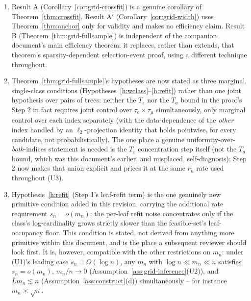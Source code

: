\documentclass[11pt]{article}
\theoremstyle{plain}
\theoremstyle{definition}
\theoremstyle{remark}
\begin{document}
\begin{enumerate}[label=(\alph*),leftmargin=*]
\item Result A (Corollary~\ref{cor:grid-crossfit}) is a genuine corollary
of Theorem~\ref{thm:crossfit}. Result A$'$ (Corollary~\ref{cor:grid-width})
uses Theorem~\ref{thm:anchor} only for validity and makes no efficiency
claim. Result B (Theorem~\ref{thm:grid-fullsample}) is independent of the
companion document's main efficiency theorem: it replaces, rather than
extends, that theorem's sparsity-dependent selection-event proof, using a
different technique throughout.

\item Theorem~\ref{thm:grid-fullsample}'s hypotheses are now stated as
three marginal, single-class conditions
(Hypotheses~\ref{h:wclass}--\ref{h:refit}) rather than one joint hypothesis
over pairs of trees: neither the $T_\varepsilon$ nor the $T_a$ bound in the
proof's Step 2 in fact requires joint control over $\tau_e\times\tau_\mu$
simultaneously, only marginal control over each index separately (with the
data-dependence of the \emph{other} index handled by an $\ell_2$-projection
identity that holds pointwise, for every candidate, not probabilistically).
The one place a genuine uniformity-over-\emph{both}-indices statement is
needed is the $T_\varepsilon$ concentration step itself (not the $T_a$
bound, which was this document's earlier, and misplaced, self-diagnosis);
Step 2 now makes that union explicit and prices it at the same $r_n$ rate
used throughout (U3).

\item Hypothesis~\ref{h:refit} (Step 1's leaf-refit term) is the one
genuinely new primitive condition added in this revision, carrying the
additional rate requirement $s_n=o(m_n)$: the per-leaf refit noise
concentrates only if the class's log-cardinality grows strictly slower than
the feasible-set's leaf-occupancy floor. This condition is stated, not
derived from anything more primitive within this document, and is the
place a subsequent reviewer should look first. It is, however, compatible
with the other restrictions on $m_n$: under (U1)'s leading case
$s_n=O(\log n)$, any $m_n$ with $\log n\ll m_n\ll n$ satisfies
$s_n=o(m_n)$, $m_n/n\to0$ (Assumption~\ref{ass:grid-inference}(U2)), and
$\bar Lm_n\lesssim n$ (Assumption~\ref{ass:construct}(d)) simultaneously --
for instance $m_n\asymp\sqrt n$.

\end{enumerate}
\end{document}
